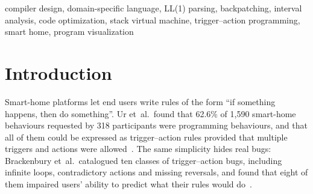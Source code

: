 \documentclass[conference]{IEEEtran}
\newcommand{\code}[1]{\texttt{#1}}
\begin{document}
\begin{abstract}
We present HomeLang, a complete compiler for a domain-specific trigger--action language that automates a smart home, together with an interactive web application that exposes the output of every compilation phase. A program such as \code{IF TEMPERATURE > 30 THEN TURN\_ON AC} passes through seven stages: a maximal-munch lexer driven by six deterministic finite automata stored as data; a hand-written LL(1) recursive-descent parser whose grammar is machine-checked for conflicts; a semantic analyzer with a symbol table, a dimensional type system, interval analysis over disjunctive normal form, and loop detection with Tarjan's strongly connected components; quadruple three-address code produced with backpatching; nine optimization passes, each with a stated safety argument; bytecode generation for a stack virtual machine; and a discrete-event simulation that animates a floor plan. The compiler defines 74 diagnostic codes across lexical, syntactic, semantic and run-time errors, each with a position and a hint. Correctness is established by 1104 unit and golden tests, 56 browser tests, and a three-way differential test in which an AST interpreter, the unoptimized VM and the optimized VM must produce identical event logs on every example, 39 targeted programs and 400 random programs. On the optimizer demonstration program the passes reduce 60 quadruples to 31 and 16 jumps to 4. A full compilation of the largest example takes under 4\,ms.
\end{abstract}

\begin{IEEEkeywords}
compiler design, domain-specific language, LL(1) parsing, backpatching, interval analysis, code optimization, stack virtual machine, trigger--action programming, smart home, program visualization
\end{IEEEkeywords}

\section{Introduction}

Smart-home platforms let end users write rules of the form ``if something happens, then do something''. Ur et~al.\ found that 62.6\% of 1,590 smart-home behaviours requested by 318 participants were programming behaviours, and that all of them could be expressed as trigger--action rules provided that multiple triggers and actions were allowed~\cite{ur2014}. The same simplicity hides real bugs: Brackenbury et~al.\ catalogued ten classes of trigger--action bugs, including infinite loops, contradictory actions and missing reversals, and found that eight of them impaired users' ability to predict what their rules would do~\cite{brackenbury2019}.
\end{document}
